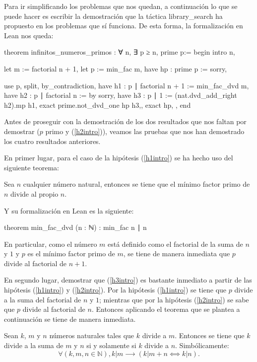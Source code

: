 Para ir simplificando los problemas que nos quedan, a continuación lo
que se puede hacer es escribir la demostración que la táctica
 {library\_search} ha propuesto en los problemas
que sí funciona. De esta forma, la formalización en Lean nos queda:
\begin{leancode}
theorem infinitos_numeros_primos : ∀ n, ∃ p ≥ n, prime p:=
begin
  intro n,

  let m := factorial n + 1,
  let p := min_fac m,
  have hp : prime p := sorry,

  use p,
  split,
  { by_contradiction,
    have h1 : p ∣ factorial n + 1 := min_fac_dvd m,
    have h2 : p ∣ factorial n := by sorry,
    have h3 : p ∣ 1 := (nat.dvd_add_right h2).mp h1,
    exact prime.not_dvd_one hp h3,},
  { exact hp, },
end
\end{leancode}

Antes de proseguir con la demostración de los dos resultados que nos faltan
por demostrar (\(p\) primo y (\ref{h2intro})), veamos las pruebas que nos han
demostrado los cuatro resultados anteriores.

En primer lugar, para el caso de la hipótesis (\ref{h1intro}) se ha hecho uso
del siguiente teorema:
\begin{teorema}
  Sea \(n\) cualquier número natural, entonces se tiene que el mínimo factor
  primo de \(n\) divide al propio \(n\).
\end{teorema}
Y su formalización en Lean es la siguiente:
\begin{leancode}
theorem min_fac_dvd (n : ℕ) : min_fac n ∣ n
\end{leancode}

En particular, como el número \(m\) está definido como el factorial de la suma
de \(n\) y \(1\) y \(p\) es el mínimo factor primo de \(m\), se tiene de manera
inmediata que \(p\) divide al factorial de \(n+1\).


En segundo lugar, demostrar que (\ref{h3intro}) es bastante inmediato a partir
de las hipótesis (\ref{h1intro}) y (\ref{h2intro}). Por la hipótesis
(\ref{h1intro}) se tiene que \(p\) divide a la suma del factorial de \(n\) y
\(1\); mientras que por la hipótesis (\ref{h2intro}) se sabe que \(p\) divide
al factorial de \(n\). Entonces aplicando el teorema que se plantea a
continuación se tiene de manera inmediata.
\begin{teorema}
  Sean \(k\), \(m\) y \(n\) números naturales tales que \(k\) divide a
  \(m\). Entonces se tiene que \(k\) divide a la suma de \(m\) y \(n\)
  si y solamente si \(k\) divide a \(n\).  Simbólicamente:
  \begin{equation*}
    ∀(k,m,n∈ℕ), k|m ⟶ (k|m+n⟺k|n).
  \end{equation*}
\end{teorema}

